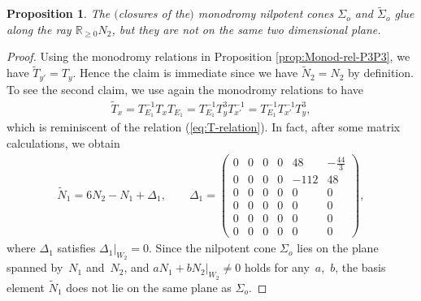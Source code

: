 \documentclass[10pt,a4paper]{amsart}
\numberwithin{equation}{section}
\newtheorem{Proposition}[Theorem]{Proposition}
\begin{document}
\begin{Proposition}\label{prop:Glue-P3P3-Tx}The $($closures of the$)$ monodromy nilpotent cones $\Sigma_{o}$ and $\tilde{\Sigma}_{o}$ glue along the ray $\mathbb{R}_{\geq0}N_{2}$, but they are not on the same two dimensional plane. \end{Proposition}
\begin{proof}Using the monodromy relations in Proposition \ref{prop:Monod-rel-P3P3}, we have $\tilde{T}_{y'}=T_{y}$. Hence the claim is immediate since we have $\tilde{N}_{2}=N_{2}$ by definition. To see the second claim, we use again the monodromy relations to have
\begin{gather*}
\tilde{T}_{x}=T_{E_{1}}^{-1}T_{x}T_{E_{1}}=T_{E_{1}}^{-1}T_{y}^{3}T_{x'}^{-1}=T_{E_{1}}^{-1}T_{x'}^{-1}T_{y}^{3},
\end{gather*}
which is reminiscent of the relation (\ref{eq:T-relation}). In fact, after some matrix calculations, we obtain
\begin{gather}
\tilde{N}_{1}=6N_{2}-N_{1}+\Delta_{1},\qquad \Delta_{1}=\left(\begin{smallmatrix}0 & 0 & 0 & 0 & 48 & -\frac{44}{3}\\
0 & 0 & 0 & 0 & -112 & 48\\
0 & 0 & 0 & 0 & 0 & 0\\
0 & 0 & 0 & 0 & 0 & 0\\
0 & 0 & 0 & 0 & 0 & 0\\
0 & 0 & 0 & 0 & 0 & 0
\end{smallmatrix}\right),\label{eq:tildeN1}
\end{gather}
where $\Delta_{1}$ satisfies $\Delta_{1}\vert_{W_{2}}=0$. Since the nilpotent cone $\Sigma_{o}$ lies on the plane spanned by~$N_{1}$ and~$N_{2}$, and $aN_{1}+bN_{2}\vert_{W_{2}}\not=0$ holds for any~$a$,~$b$, the basis element $\tilde{N}_{1}$ does not lie on the same plane as $\Sigma_{o}$.
\end{proof}
\end{document}
